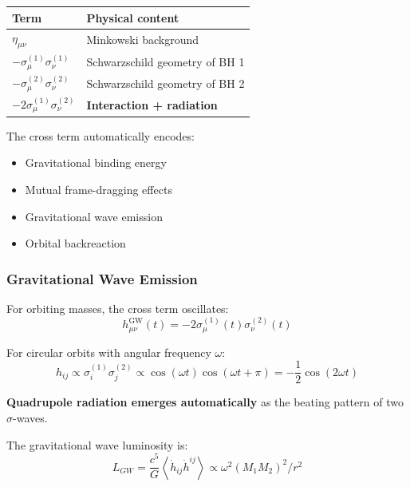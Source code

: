 \documentclass[11pt,a4paper]{article}
\theoremstyle{definition}
\theoremstyle{remark}
\begin{document}
	\begin{table}[h]
		\centering
		\begin{tabular}{ll}
			\toprule
			Term & Physical content \\
			\midrule
			$\eta_{\mu\nu}$ & Minkowski background \\
			$-\sigma_\mu^{(1)}\sigma_\nu^{(1)}$ & Schwarzschild geometry of BH 1 \\
			$-\sigma_\mu^{(2)}\sigma_\nu^{(2)}$ & Schwarzschild geometry of BH 2 \\
			$-2\sigma_\mu^{(1)}\sigma_\nu^{(2)}$ & \textbf{Interaction + radiation} \\
			\bottomrule
		\end{tabular}
	\end{table}
	
	The cross term automatically encodes:
	\begin{itemize}
		\item Gravitational binding energy
		\item Mutual frame-dragging effects
		\item Gravitational wave emission
		\item Orbital backreaction
	\end{itemize}
	
	\subsubsection{Gravitational Wave Emission}
	
	For orbiting masses, the cross term oscillates:
	\begin{equation}
		h_{\mu\nu}^{\text{GW}}(t) = -2\sigma_\mu^{(1)}(t)\sigma_\nu^{(2)}(t)
	\end{equation}
	
	For circular orbits with angular frequency $\omega$:
	\begin{equation}
		h_{ij} \propto \sigma_i^{(1)}\sigma_j^{(2)} \propto \cos(\omega t)\cos(\omega t + \pi) = -\frac{1}{2}\cos(2\omega t)
	\end{equation}
	
	\textbf{Quadrupole radiation emerges automatically} as the beating pattern of two $\sigma$-waves.
	
	The gravitational wave luminosity is:
	\begin{equation}
		L_{GW} = \frac{c^5}{G}\left\langle \dot{h}_{ij}\dot{h}^{ij}\right\rangle \propto \omega^2(M_1M_2)^2/r^2
	\end{equation}
	
\end{document}
